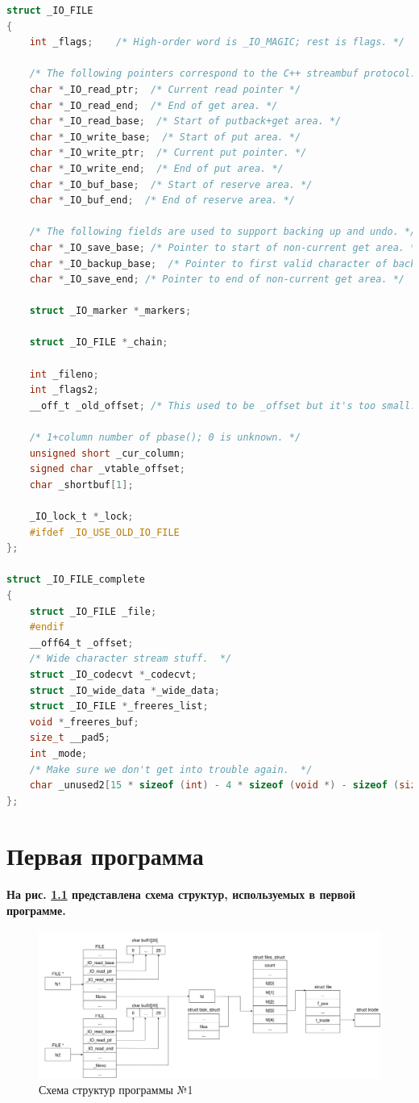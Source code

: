 \documentclass[12pt]{report}
\begin{document}
\begin{lstlisting}[language=c, label=_io_file, caption=Листинг структуры \_IO\_FILE]
struct _IO_FILE
{
	int _flags;    /* High-order word is _IO_MAGIC; rest is flags. */

	/* The following pointers correspond to the C++ streambuf protocol. */
	char *_IO_read_ptr;  /* Current read pointer */
	char *_IO_read_end;  /* End of get area. */
	char *_IO_read_base;  /* Start of putback+get area. */
	char *_IO_write_base;  /* Start of put area. */
	char *_IO_write_ptr;  /* Current put pointer. */
	char *_IO_write_end;  /* End of put area. */
	char *_IO_buf_base;  /* Start of reserve area. */
	char *_IO_buf_end;  /* End of reserve area. */
	
	/* The following fields are used to support backing up and undo. */
	char *_IO_save_base; /* Pointer to start of non-current get area. */
	char *_IO_backup_base;  /* Pointer to first valid character of backup area */
	char *_IO_save_end; /* Pointer to end of non-current get area. */
	
	struct _IO_marker *_markers;
	
	struct _IO_FILE *_chain;
	
	int _fileno;
	int _flags2;
	__off_t _old_offset; /* This used to be _offset but it's too small.  */
	
	/* 1+column number of pbase(); 0 is unknown. */
	unsigned short _cur_column;
	signed char _vtable_offset;
	char _shortbuf[1];
	
	_IO_lock_t *_lock;
	#ifdef _IO_USE_OLD_IO_FILE
};

struct _IO_FILE_complete
{
	struct _IO_FILE _file;
	#endif
	__off64_t _offset;
	/* Wide character stream stuff.  */
	struct _IO_codecvt *_codecvt;
	struct _IO_wide_data *_wide_data;
	struct _IO_FILE *_freeres_list;
	void *_freeres_buf;
	size_t __pad5;
	int _mode;
	/* Make sure we don't get into trouble again.  */
	char _unused2[15 * sizeof (int) - 4 * sizeof (void *) - sizeof (size_t)];
};
\end{lstlisting}
	
\chapter{Первая программа}

\textbf{На рис. \ref{fig:prog_01_schema} представлена схема структур, используемых в первой программе.}

\begin{figure}[H]
	\centering
	\includegraphics[scale=0.33]{img/prog_01_schema.jpg}
	\caption{Схема структур программы №1}
	\label{fig:prog_01_schema}
\end{figure}
\end{document}
